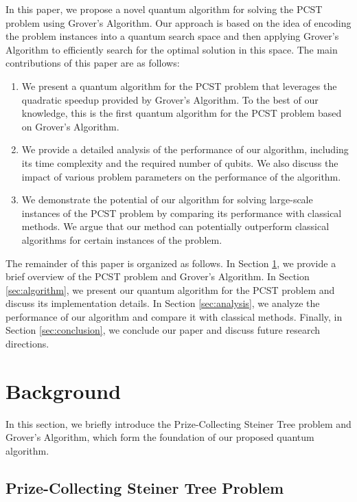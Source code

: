 In this paper, we propose a novel quantum algorithm for solving the PCST problem using Grover's Algorithm. Our approach is based on the idea of encoding the problem instances into a quantum search space and then applying Grover's Algorithm to efficiently search for the optimal solution in this space. The main contributions of this paper are as follows:

\begin{enumerate}
    \item We present a quantum algorithm for the PCST problem that leverages the quadratic speedup provided by Grover's Algorithm. To the best of our knowledge, this is the first quantum algorithm for the PCST problem based on Grover's Algorithm.
    \item We provide a detailed analysis of the performance of our algorithm, including its time complexity and the required number of qubits. We also discuss the impact of various problem parameters on the performance of the algorithm.
    \item We demonstrate the potential of our algorithm for solving large-scale instances of the PCST problem by comparing its performance with classical methods. We argue that our method can potentially outperform classical algorithms for certain instances of the problem.
\end{enumerate}

The remainder of this paper is organized as follows. In Section \ref{sec:background}, we provide a brief overview of the PCST problem and Grover's Algorithm. In Section \ref{sec:algorithm}, we present our quantum algorithm for the PCST problem and discuss its implementation details. In Section \ref{sec:analysis}, we analyze the performance of our algorithm and compare it with classical methods. Finally, in Section \ref{sec:conclusion}, we conclude our paper and discuss future research directions.

\section{Background}
\label{sec:background}

In this section, we briefly introduce the Prize-Collecting Steiner Tree problem and Grover's Algorithm, which form the foundation of our proposed quantum algorithm.

\subsection{Prize-Collecting Steiner Tree Problem}

